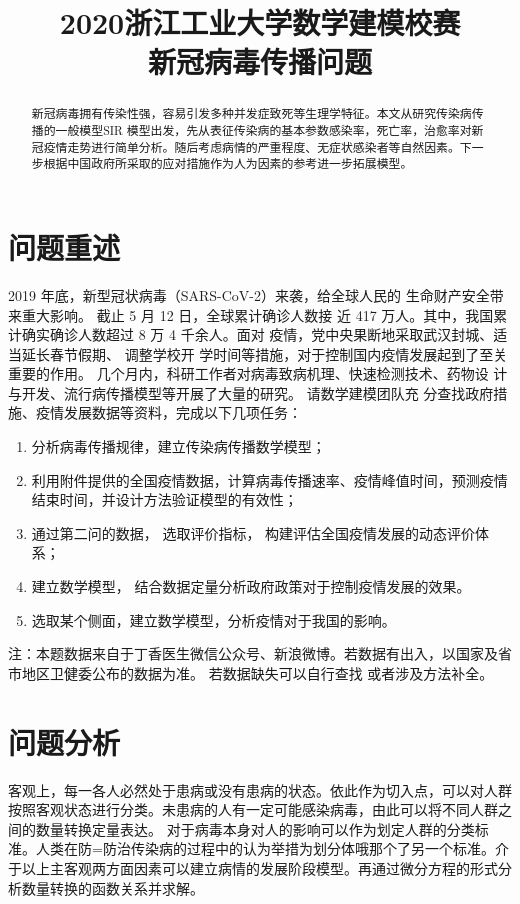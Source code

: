 \documentclass[withoutpreface,bwprint]{cumcmthesis} %
\title{2020浙江工业大学数学建模校赛\\新冠病毒传播问题}
\begin{document}
 \maketitle



\begin{abstract}
新冠病毒拥有传染性强，容易引发多种并发症致死等生理学特征。本文从研究传染病传播的一般模型SIR 模型出发，先从表征传染病的基本参数感染率，死亡率，治愈率对新冠疫情走势进行简单分析。随后考虑病情的严重程度、无症状感染者等自然因素。下一步根据中国政府所采取的应对措施作为人为因素的参考进一步拓展模型。
\end{abstract}

\section{问题重述}

2019 年底，新型冠状病毒（SARS-CoV-2）来袭，给全球人民的
生命财产安全带来重大影响。 截止 5 月 12 日，全球累计确诊人数接
近 417 万人。其中，我国累计确实确诊人数超过 8 万 4 千余人。面对
疫情，党中央果断地采取武汉封城、适当延长春节假期、 调整学校开
学时间等措施，对于控制国内疫情发展起到了至关重要的作用。
几个月内，科研工作者对病毒致病机理、快速检测技术、药物设
计与开发、流行病传播模型等开展了大量的研究。 请数学建模团队充
分查找政府措施、疫情发展数据等资料，完成以下几项任务：
    \begin{enumerate}
        \item 分析病毒传播规律，建立传染病传播数学模型；
        \item 利用附件提供的全国疫情数据，计算病毒传播速率、疫情峰值时间，预测疫情结束时间，并设计方法验证模型的有效性；
        \item 通过第二问的数据， 选取评价指标， 构建评估全国疫情发展的动态评价体系；
        \item 建立数学模型， 结合数据定量分析政府政策对于控制疫情发展的效果。
        \item 选取某个侧面，建立数学模型，分析疫情对于我国的影响。
    \end{enumerate}
注：本题数据来自于丁香医生微信公众号、新浪微博。若数据有出入，以国家及省市地区卫健委公布的数据为准。 若数据缺失可以自行查找
或者涉及方法补全。
\section{问题分析}
客观上，每一各人必然处于患病或没有患病的状态。依此作为切入点，可以对人群按照客观状态进行分类。未患病的人有一定可能感染病毒，由此可以将不同人群之间的数量转换定量表达。
对于病毒本身对人的影响可以作为划定人群的分类标准。人类在防=防治传染病的过程中的认为举措为划分体哦那个了另一个标准。介于以上主客观两方面因素可以建立病情的发展阶段模型。再通过微分方程的形式分析数量转换的函数关系并求解。
\end{document}
